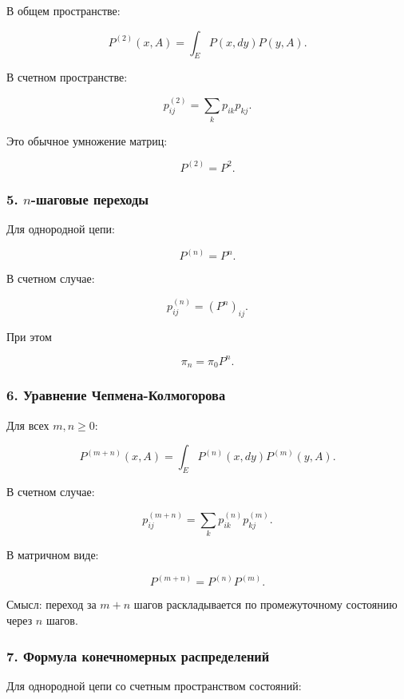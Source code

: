 \documentclass[
  11pt,
  a4paper,
]{article}
\begin{document}
В общем пространстве:

\[
P^{(2)}(x,A)
=
\int_E P(x,dy)P(y,A).
\]

В счетном пространстве:

\[
p_{ij}^{(2)}
=
\sum_k p_{ik}p_{kj}.
\]

Это обычное умножение матриц:

\[
P^{(2)}=P^2.
\]

\subsubsection{\texorpdfstring{5. \(n\)-шаговые
переходы}{5. n-шаговые переходы}}\label{n-ux448ux430ux433ux43eux432ux44bux435-ux43fux435ux440ux435ux445ux43eux434ux44b}

Для однородной цепи:

\[
P^{(n)}=P^n.
\]

В счетном случае:

\[
p_{ij}^{(n)}
=
(P^n)_{ij}.
\]

При этом

\[
\pi_n=\pi_0P^n.
\]

\subsubsection{6. Уравнение
Чепмена-Колмогорова}\label{ux443ux440ux430ux432ux43dux435ux43dux438ux435-ux447ux435ux43fux43cux435ux43dux430-ux43aux43eux43bux43cux43eux433ux43eux440ux43eux432ux430-1}

Для всех \(m,n\ge0\):

\[
P^{(m+n)}(x,A)
=
\int_E P^{(n)}(x,dy)P^{(m)}(y,A).
\]

В счетном случае:

\[
p_{ij}^{(m+n)}
=
\sum_kp_{ik}^{(n)}p_{kj}^{(m)}.
\]

В матричном виде:

\[
P^{(m+n)}=P^{(n)}P^{(m)}.
\]

Смысл: переход за \(m+n\) шагов раскладывается по промежуточному
состоянию через \(n\) шагов.

\subsubsection{7. Формула конечномерных
распределений}\label{ux444ux43eux440ux43cux443ux43bux430-ux43aux43eux43dux435ux447ux43dux43eux43cux435ux440ux43dux44bux445-ux440ux430ux441ux43fux440ux435ux434ux435ux43bux435ux43dux438ux439}

Для однородной цепи со счетным пространством состояний:
\end{document}
